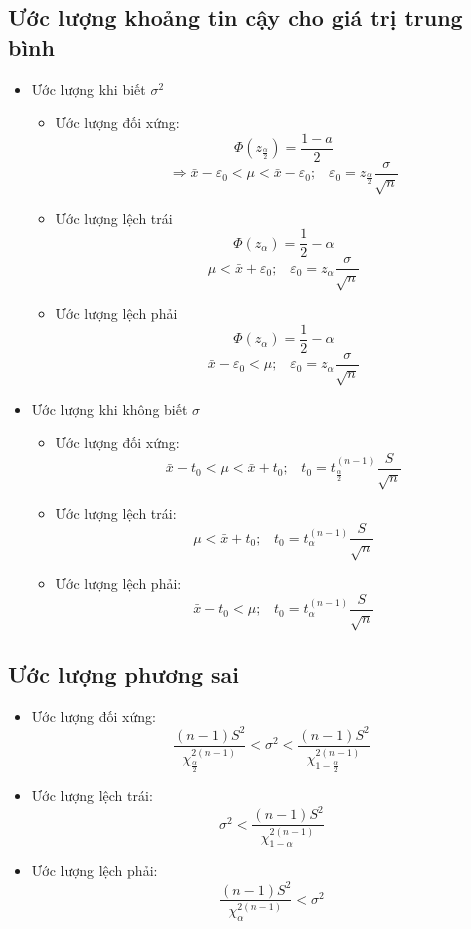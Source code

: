 \documentclass[utf8,a4paper]{article}
\begin{document}
\subsection[]{Ước lượng khoảng tin cậy cho giá trị trung bình}
\begin{itemize}
  \item Ước lượng khi biết \({\sigma}^{2}\)
    \begin{itemize}
      \item Ước lượng đối xứng:
        \[\Phi\left({z}_{\frac{\alpha}{2}}\right) = \frac{1 - a}{2}\]
        \[\Rightarrow \bar{x} - {\varepsilon}_{0} < \mu < \bar{x} - {\varepsilon}_{0}; \;\;\;
          {\varepsilon}_{0} = {z}_{\frac{\alpha}{2}}\frac{\sigma}{\sqrt{n}}\]
      \item Ước lượng lệch trái
        \[\Phi\left({z}_{\alpha}\right) = \frac{1}{2} - \alpha\]
        \[\mu < \bar{x} + {\varepsilon}_{0}; \;\;\;
          {\varepsilon}_{0} = {z}_{\alpha} \frac{\sigma}{\sqrt{n}}\]
      \item Ước lượng lệch phải
        \[\Phi\left({z}_{\alpha}\right) = \frac{1}{2} - \alpha\]
        \[\bar{x} - {\varepsilon}_{0}< \mu; \;\;\;
          {\varepsilon}_{0} = {z}_{\alpha} \frac{\sigma}{\sqrt{n}}\]
    \end{itemize}
  \item Ước lượng khi không biết \(\sigma\)
    \begin{itemize}
      \item Ước lượng đối xứng:
        \[\bar{x} - {t}_{0} < \mu < \bar{x} + {t}_{0}; \;\;\;
          {t}_{0} = {t}^{\left(n - 1\right)}_{\frac{\alpha}{2}} \frac{S}{\sqrt{n}} \]
      \item Ước lượng lệch trái:
        \[\mu < \bar{x} + {t}_{0}; \;\;\;
          {t}_{0} = {t}^{\left(n - 1\right)}_{\alpha} \frac{S}{\sqrt{n}} \]
      \item Ước lượng lệch phải:
        \[\bar{x} - {t}_{0} < \mu; \;\;\;
          {t}_{0} = {t}^{\left(n - 1\right)}_{\alpha} \frac{S}{\sqrt{n}} \]
    \end{itemize}
\end{itemize}

\subsection[]{Ước lượng phương sai}
\begin{itemize}
  \item Ước lượng đối xứng:
    \[\frac{\left(n - 1\right) {S}^{2}}{{\chi}^{2\left(n - 1\right)}_{\frac{\alpha}{2}}}
      < {\sigma}^{2} <
      \frac{\left(n - 1\right) {S}^{2}}{{\chi}^{2\left(n - 1\right)}_{1 -\frac{\alpha}{2}}}\]
  \item Ước lượng lệch trái:
    \[{\sigma}^{2} <
      \frac{\left(n - 1\right) {S}^{2}}{{\chi}^{2\left(n - 1\right)}_{1 -\alpha}}\]
  \item Ước lượng lệch phải:
    \[\frac{\left(n - 1\right) {S}^{2}}{{\chi}^{2\left(n - 1\right)}_{\alpha}}
      < {\sigma}^{2}\]
\end{itemize}
\end{document}
